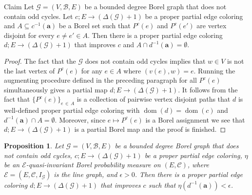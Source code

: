 \documentclass[10pt]{amsart}
\newtheorem{prop}[cdrthm]{Proposition}
\theoremstyle{definition}
\DeclareMathOperator{\dom}{dom}
\newcommand{\bfa}{\mathbf{a}}
\newcommand{\clG}{\mathcal{G}}
\newcommand{\clB}{\mathcal{B}}
\newcommand{\clE}{\mathcal{E}}
\newcommand{\clC}{\mathcal{C}}
\begin{document}
\begin{enonce}{Claim}\label{cl:augment}
Let $\clG=(V,\clB,E)$ be a bounded degree Borel graph that does not contain odd cycles. Let $c;E\to (\Delta(\clG)+1)$ be a proper partial edge coloring and $A\subseteq c^{-1}(\bfa)$ be a Borel set such that $P^c(e)$ and $P^c(e')$ are vertex disjoint for every $e\not =e'\in A$. Then there is a proper partial edge coloring $d;E\to (\Delta(\clG)+1)$ that improves $c$ and $A\cap d^{-1}(\bfa)=\emptyset$.
\end{enonce}


\begin{proof}
The fact that the $\clG$ does not contain odd cycles implies that $w\in V$ is not the last vertex of $P^c(e)$ for any $e\in A$ where $(v(e),w)=e$. Running the augmenting procedure defined in the preceding paragraph for all $P^c(e)$ simultaneously gives a partial map $d;E\to (\Delta(\clG)+1)$. It follows from the fact that $\{P^c(e)\}_{e\,\in\,A}$ is a collection of pairwise vertex disjoint paths that $d$ is well-defined proper partial edge coloring with $\dom(d)=\dom(c)$ and $d^{-1}(\bfa)\cap A=\emptyset$. Moreover, since $e\mapsto P^c(e)$ is a Borel assignment we see that $d;E\to (\Delta(\clG)+1)$ is a partial Borel map and the proof is finished.
\end{proof}

\begin{prop}\label{pr:main}
Let $\clG=(V,\clB,E)$ be a bounded degree Borel graph that does not contain odd cycles, $c;E\to (\Delta(\clG)+1)$ be a proper partial edge coloring, $\eta$ be an $\clE$-quasi-invariant Borel probability measure on $(E,\clC)$, where $\clE=(E,\clC,I_\clG)$ is the line graph, and $\epsilon>0$. Then there is a proper partial edge coloring $d;E\to (\Delta(\clG)+1)$ that improves $c$ such that $\eta(d^{-1}(\bfa))<\epsilon$.
\end{prop}
\end{document}
